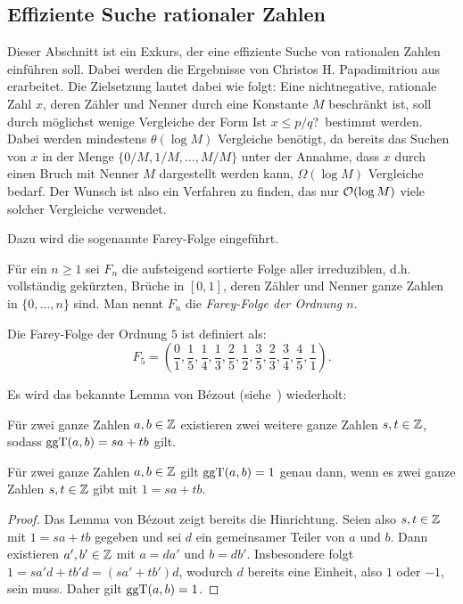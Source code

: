 \subsection{Effiziente Suche rationaler Zahlen}\label{sec-rational-search}

Dieser Abschnitt ist ein Exkurs, der eine effiziente Suche von rationalen Zahlen einführen soll.
Dabei werden die Ergebnisse von Christos H. Papadimitriou aus~\cite{Papadimitriou1979} erarbeitet.
Die Zielsetzung lautet dabei wie folgt:
Eine nichtnegative, rationale Zahl $x$, deren Zähler und Nenner durch eine Konstante $M$ beschränkt ist, soll durch möglichst wenige Vergleiche der Form \glqq Ist $x\leq p/q$?\grqq\ bestimmt werden.
Dabei werden mindestens $\theta(\log M)$ Vergleiche benötigt, da bereits das Suchen von $x$ in der Menge $\{ 0/M, 1/M, \dots, M/M \}$ unter der Annahme, dass $x$ durch einen Bruch mit Nenner $M$ dargestellt werden kann, $\Omega(\log M)$ Vergleiche bedarf.
Der Wunsch ist also ein Verfahren zu finden, das nur $\mathcal{O}(\log M)$ viele solcher Vergleiche verwendet.

Dazu wird die sogenannte Farey-Folge eingeführt.

\begin{definition}
	Für ein $n\geq 1$ sei $F_n$ die aufsteigend sortierte Folge aller irreduziblen, d.h. vollständig gekürzten, Brüche in $[0,1]$, deren Zähler  und Nenner ganze Zahlen in $\{0, \dots, n\}$ sind.
	Man nennt $F_n$ die \emph{Farey-Folge der Ordnung $n$}.
\end{definition}

\begin{example}
	Die Farey-Folge der Ordnung $5$ ist definiert als:
	\[
		F_5 = \left( \frac{0}{1}, \frac{1}{5}, \frac{1}{4}, \frac{1}{3}, \frac{2}{5}, \frac{1}{2}, \frac{3}{5}, \frac{2}{3}, \frac{3}{4}, \frac{4}{5}, \frac{1}{1} \right).
	\]
\end{example}

Es wird das bekannte Lemma von Bézout (siehe~) wiederholt:
\begin{lemma}\label{lemma-von-bezout}
	Für zwei ganze Zahlen $a, b\in\mathbb{Z}$ existieren zwei weitere ganze Zahlen $s,t\in\mathbb{Z}$, sodass $\operatorname{ggT}(a,b) = sa + tb$ gilt.
\end{lemma}

\begin{corollary}\label{cor-bezout-reverted}
	Für zwei ganze Zahlen $a,b\in\mathbb{Z}$ gilt $\operatorname{ggT}(a,b) = 1$ genau dann, wenn es zwei ganze Zahlen $s,t\in\mathbb{Z}$ gibt mit $1 = sa + tb$.
\end{corollary}
\begin{proof}
	Das Lemma von Bézout zeigt bereits die Hinrichtung.
	Seien also $s,t\in\mathbb{Z}$ mit $1= sa +tb$ gegeben und sei $d$ ein gemeinsamer Teiler von $a$ und $b$.
	Dann existieren $a',b'\in\mathbb{Z}$ mit $a=d a'$ und $b=d b'$.
	Insbesondere folgt $1 = sa'd + tb'd = (sa' + tb') d$, wodurch $d$ bereits eine Einheit, also $1$ oder $-1$, sein muss.
	Daher gilt $\operatorname{ggT}(a,b)=1$.
\end{proof}


